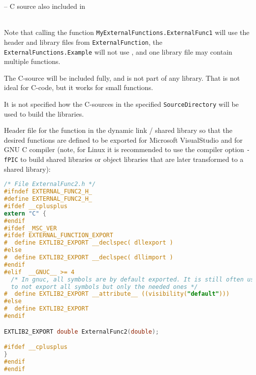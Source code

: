 \begin{example}
{\begin{tabbing}
\quad\quad\quad{}            \>-- \>C source also included in \\
\\
\quad{}%
\end{tabbing}}
\ifpdf
\else
\par
\fi
Note that calling the function {\lstinline!MyExternalFunctions.ExternalFunc1!} will use the header and library files from {\lstinline!ExternalFunction!}, the {\lstinline!ExternalFunctions.Example!} will not use , and one library file may contain multiple functions.

The C-source  will be included fully, and is not part of any library.
That is not ideal for C-code, but it works for small functions.

It is not specified how the C-sources in the specified {\lstinline!SourceDirectory!} will be used to build the libraries.

Header file for the function in the dynamic link / shared library  so that the desired functions are defined to be exported for Microsoft VisualStudio and for GNU C compiler (note, for Linux it is recommended to use the compiler option {\lstinline!-fPIC!} to build shared libraries or object libraries that are later transformed to a shared library):
\begin{lstlisting}[language=C]
/* File ExternalFunc2.h */
#ifndef EXTERNAL_FUNC2_H_
#define EXTERNAL_FUNC2_H_
#ifdef __cplusplus
extern "C" {
#endif
#ifdef _MSC_VER
#ifdef EXTERNAL_FUNCTION_EXPORT
#  define EXTLIB2_EXPORT __declspec( dllexport )
#else
#  define EXTLIB2_EXPORT __declspec( dllimport )
#endif
#elif  __GNUC__ >= 4
  /* In gnuc, all symbols are by default exported. It is still often useful,
  to not export all symbols but only the needed ones */
#  define EXTLIB2_EXPORT __attribute__ ((visibility("default")))
#else
#  define EXTLIB2_EXPORT
#endif

EXTLIB2_EXPORT double ExternalFunc2(double);

#ifdef __cplusplus
}
#endif
#endif
\end{lstlisting}
\end{example}

